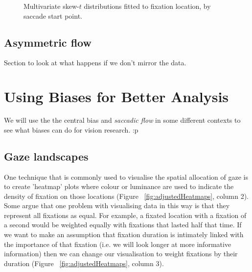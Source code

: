 \documentclass[a4paper, onecolumn, oneside, 11pt]{article}
\begin{document}
\begin{figure}
\caption{Multivariate skew-$t$ distributions fitted to fixation location, by saccade start point.}
\label{fig:exampleSkewNormal}
\end{figure}

\subsection{Asymmetric flow}

Section to look at what happens if we don't mirror the data.


\section{Using Biases for Better Analysis}

We will use the the central bias \citep{clarke-tatler2014} and \textit{saccadic flow} in some different contexts to see what biases can do for vision research. :p


\subsection{Gaze landscapes}

One technique that is commonly used to visualise the spatial allocation of gaze is to create 'heatmap' plots where colour or luminance are used to indicate the density of fixation on those locations (Figure ~\ref{fig:adjustedHeatmaps}, column 2). Some argue that one problem with visualising data in this way is that they represent all fixations as equal. For example, a fixated location with a fixation of a second would be weighted equally with fixations that lasted half that time. If we want to make an assumption that fixation duration is intimately linked with the importance of that fixation (i.e. we will look longer at more informative information) then we can change our visualisation to weight fixations by their duration (Figure ~\ref{fig:adjustedHeatmaps}, column 3).
\end{document}
